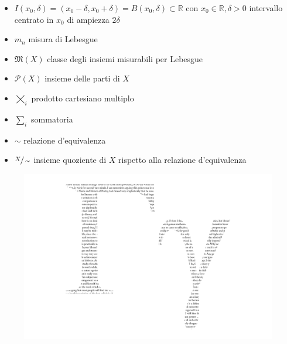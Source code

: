 \documentclass[12pt, twoside, italian]{book}
\begin{document}
\begin{itemize}[label=\hspace{-0.5em}]
		\item $I(x_0, \delta) = (x_0 - \delta, x_0 + \delta) = B(x_0, \delta) \subset \mathbb{R}$ con $x_0 \in \mathbb{R}, \delta > 0$ intervallo centrato in $x_0$ di ampiezza $2\delta$
		\item $m_n$ misura di Lebesgue
		\item $\mathfrak{M}(X)$ classe degli insiemi misurabili per Lebesgue
		\item $\mathcal{P}(X)$ insieme delle parti di $X$
		\item $\varprod\limits_i$ prodotto cartesiano multiplo
		\item $\sum\limits_i$ sommatoria
		\item $\sim$ relazione d'equivalenza
		\item $\sfrac{X}{\sim}$ insieme quoziente di $X$ rispetto alla relazione d'equivalenza
 
	\end{itemize}
	
	
	
	
	
	
	
	\newpage
	\cleardoublepage
	\pagestyle{plain}
	\thispagestyle{empty}
	\vspace*{\fill}
	\begin{figure}[H]
		\centering
		\hspace*{-1cm}
		\includegraphics[scale=0.25]{immagini/gamma_illustrata.png}
	\end{figure}
	\vspace*{\fill}
	\pagestyle{empty}
\end{document}
